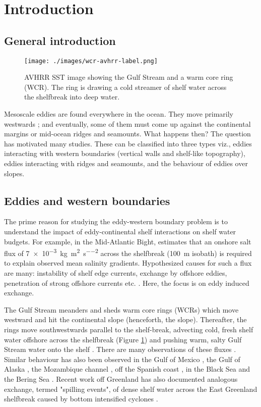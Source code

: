 \section{Introduction}
\label{sec-1}
\subsection{General introduction}
\label{sec-1-1}
\begin{figure}[htb]
\centering
\texttt{[image: ./images/wcr-avhrr-label.png]}
\caption{\label{fig:WCRSST}AVHRR SST image showing the Gulf Stream and a warm core ring (WCR). The ring is drawing a cold streamer of shelf water across the shelfbreak into deep water.}
\end{figure}

Mesoscale eddies are found everywhere in the ocean. They move primarily westwards \citep{Chelton2011}; and eventually, some of them must come up against the continental margins or mid-ocean ridges and seamounts. What happens then? The question has motivated many studies. These can be classified into three types viz., eddies interacting with western boundaries (vertical walls and shelf-like topography), eddies interacting with ridges and seamounts, and the behaviour of eddies over slopes.
\subsection{Eddies and western boundaries}
\label{sec-1-2}
\label{sec:introboundary}
The prime reason for studying the eddy-western boundary problem is to understand the impact of eddy-continental shelf interactions on shelf water budgets. For example, in the Mid-Atlantic Bight, \citet{Lentz2010} estimates that an onshore salt flux of \SI{7e-3}{\kilogram\per\square\metre\per\square\second} across the shelfbreak (\SI{100}{m} isobath) is required to explain observed mean salinity gradients. Hypothesized causes for such a flux are many: instability of shelf edge currents, exchange by offshore eddies, penetration of strong offshore currents etc. \citep[see][]{Brink1998}. Here, the focus is on eddy induced exchange.

The Gulf Stream meanders and sheds warm core rings (WCRs) which move westward and hit the continental slope (henceforth, the slope). Thereafter, the rings move southwestwards parallel to the shelf-break, advecting cold, fresh shelf water offshore across the shelfbreak (Figure \ref{fig:WCRSST}) and pushing warm, salty Gulf Stream water onto the shelf \citep{Lee2010}. There are many observations of these fluxes \citep[for e.g.,][]{Houghton1986,Garfield1987,Joyce1992, Lee2010, Cenedese2013}. Similar behaviour has also been observed in the Gulf of Mexico \citep{Frolov2004}, the Gulf of Alaska \citep{Okkonen2003, Ladd2007}, the Mozambique channel \citep{Roberts2014}, off the Spanish coast \citep{Peliz2004}, in the Black Sea \citep{Shapiro2010, Zhou2014} and the Bering Sea \citep{Mizobata2006}. Recent work off Greenland has also documented analogous exchange, termed "spilling events", of dense shelf water across the East Greenland shelfbreak caused by bottom intensified cyclones \citep{Magaldi2011, Harden2014}.


